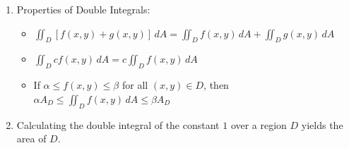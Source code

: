 \documentclass[10pt]{article}
\begin{document}
\begin{multicols*}{2}
\begin{enumerate}
\begin{enumerate}
        \item Properties of Double Integrals:
        \begin{itemize}
            \item $\iint_D [f(x,y) + g(x,y)] \,dA = \iint_D f(x,y) \,dA + \iint_D g(x,y) \,dA$
            \item $\iint_D cf(x,y) \,dA = c \iint_D f(x,y) \,dA$
            \item If $\alpha \leq f(x,y) \leq \beta$ for all $(x,y) \in D$, then $\alpha A_D \leq \iint_D f(x,y) \,dA \leq \beta A_D$
        \end{itemize} 
        
        \item Calculating the double integral of the constant $1$ over a region $D$ yields the area of $D$.
        
    \end{enumerate}
    

\end{enumerate}
\end{multicols*}
\end{document}
